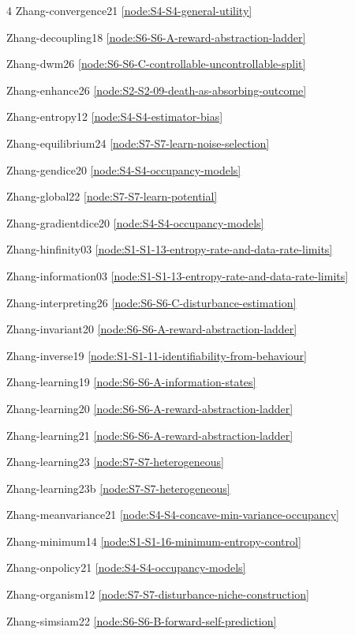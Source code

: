 \documentclass[10pt]{article}
\begin{document}
{\begin{multicols}{4}
Zhang-convergence21 \hfill \ref{node:S4-S4-general-utility}\par
Zhang-decoupling18 \hfill \ref{node:S6-S6-A-reward-abstraction-ladder}\par
Zhang-dwm26 \hfill \ref{node:S6-S6-C-controllable-uncontrollable-split}\par
Zhang-enhance26 \hfill \ref{node:S2-S2-09-death-as-absorbing-outcome}\par
Zhang-entropy12 \hfill \ref{node:S4-S4-estimator-bias}\par
Zhang-equilibrium24 \hfill \ref{node:S7-S7-learn-noise-selection}\par
Zhang-gendice20 \hfill \ref{node:S4-S4-occupancy-models}\par
Zhang-global22 \hfill \ref{node:S7-S7-learn-potential}\par
Zhang-gradientdice20 \hfill \ref{node:S4-S4-occupancy-models}\par
Zhang-hinfinity03 \hfill \ref{node:S1-S1-13-entropy-rate-and-data-rate-limits}\par
Zhang-information03 \hfill \ref{node:S1-S1-13-entropy-rate-and-data-rate-limits}\par
Zhang-interpreting26 \hfill \ref{node:S6-S6-C-disturbance-estimation}\par
Zhang-invariant20 \hfill \ref{node:S6-S6-A-reward-abstraction-ladder}\par
Zhang-inverse19 \hfill \ref{node:S1-S1-11-identifiability-from-behaviour}\par
Zhang-learning19 \hfill \ref{node:S6-S6-A-information-states}\par
Zhang-learning20 \hfill \ref{node:S6-S6-A-reward-abstraction-ladder}\par
Zhang-learning21 \hfill \ref{node:S6-S6-A-reward-abstraction-ladder}\par
Zhang-learning23 \hfill \ref{node:S7-S7-heterogeneous}\par
Zhang-learning23b \hfill \ref{node:S7-S7-heterogeneous}\par
Zhang-meanvariance21 \hfill \ref{node:S4-S4-concave-min-variance-occupancy}\par
Zhang-minimum14 \hfill \ref{node:S1-S1-16-minimum-entropy-control}\par
Zhang-onpolicy21 \hfill \ref{node:S4-S4-occupancy-models}\par
Zhang-organism12 \hfill \ref{node:S7-S7-disturbance-niche-construction}\par
Zhang-simsiam22 \hfill \ref{node:S6-S6-B-forward-self-prediction}\par

\end{multicols}}
\end{document}
